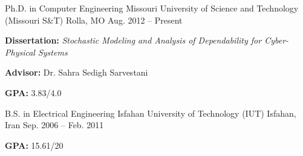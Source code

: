 \begin{cventries}
  \cventry
    {Ph.D. in Computer Engineering}
    {Missouri University of Science and Technology (Missouri S\&T)}
    {Rolla, MO}
    {Aug. 2012 -- Present}
    {
      \begin{cvitems}
        \item \textbf{Dissertation:} \emph{Stochastic Modeling and Analysis of Dependability for Cyber-Physical Systems}
        \item \textbf{Advisor:} Dr. Sahra Sedigh Sarvestani
        \item \textbf{GPA:} 3.83/4.0
      \end{cvitems}
    }
  \cventry
    {B.S. in Electrical Engineering}
    {Isfahan University of Technology (IUT)}
    {Isfahan, Iran}
    {Sep. 2006 -- Feb. 2011}
    {
      \begin{cvitems}
        \item \textbf{GPA:} 15.61/20
      \end{cvitems}
    }
\end{cventries} 